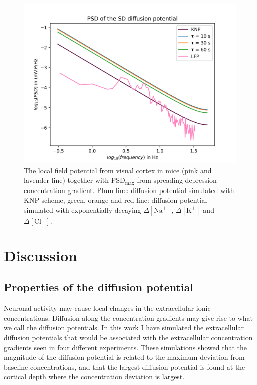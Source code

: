 \documentclass{uiophd}
\begin{document}
\begin{figure}
  \centering
  \includegraphics[width=\linewidth,height=0.6\textheight,keepaspectratio]{sd.png}
  \caption{The local field potential from visual cortex in mice (pink and lavender line) together with $\text{PSD}_{\text{max}}$ from spreading depression concentration gradient. Plum line: diffusion potential simulated with KNP scheme, green, orange and red line: diffusion potential simulated with exponentially decaying $\Delta [\text{Na}^+]$, $\Delta [\text{K}^+]$ and $\Delta [\text{Cl}^-]$.}
  \label{fig:sd}
\end{figure}



\chapter{Discussion}


\section{Properties of the diffusion potential}
Neuronal activity may cause local changes in the extracellular ionic concentrations. Diffusion along the concentration gradients may give rise to what we call the diffusion potentials. In this work I have simulated the extracellular diffusion potentials that would be associated with the extracellular concentration gradients seen in four different experiments. These simulations showed that the magnitude of the diffusion potential is related to the maximum deviation from baseline concentrations, and that the largest diffusion potential is found at the cortical depth where the concentration deviation is largest. 
\end{document}
